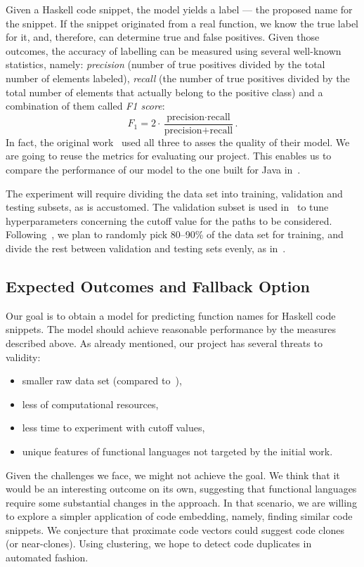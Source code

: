 \documentclass[12pt]{article}
\begin{document}
Given a Haskell code snippet, the model yields a label — the proposed name for the snippet.
If the snippet originated from a real function, we know the true label for it, and, therefore, can 
determine true and false positives.
Given those outcomes, 
the accuracy of labelling can be measured using several well-known statistics, namely: \textit{precision}
(number of true positives divided by the total number of elements labeled), \textit{recall} (the number 
of true positives divided by the total number of elements that actually belong to the positive class) 
and a combination of them called \textit{F1 score}:
\[
    F_1 = 2 \cdot \frac 
        {\text{precision}\cdot\text{recall}}
        {\text{precision} + \text{recall}}.
\]
In fact, the original \cv work~\cite{code2vec} used all three to asses the quality of their model. 
We are going
to reuse the metrics for evaluating our project. This enables us to compare the performance of our model 
to the one built for Java in~\cite{code2vec}.

The experiment will require dividing the data set into training, 
validation and testing subsets, as is accustomed.
%
The validation subset is used in~\cite{code2vec} to tune 
hyperparameters concerning the cutoff value for the paths to be considered. 
%
Following~\cite{Allamanis2018}, we plan to randomly pick 80--90\% of the data set for training, and
divide the rest between validation and testing sets evenly, as in~\cite{code2vec}.


\subsection{Expected Outcomes and Fallback Option}

Our goal is to obtain a model for predicting function names for Haskell code snippets. The model should achieve 
reasonable performance by the measures described above. As already mentioned, our
project has several threats to validity:
\begin{itemize}
    \item smaller raw data set (compared to~\cite{code2vec}),
    \item less of computational resources,
    \item less time to experiment with cutoff values,
    \item unique features of functional languages not targeted by the initial work.
\end{itemize}

Given the challenges we face, we might not achieve the goal. We think that it would be an interesting 
outcome on its own, suggesting that functional languages require some substantial changes in
the \cv approach.
In that scenario, we are willing to 
explore a simpler application of code embedding, namely, finding similar code snippets. 
We conjecture that proximate code vectors could suggest code clones (or near-clones).
Using clustering, we hope to detect code duplicates in automated fashion.
\end{document}
